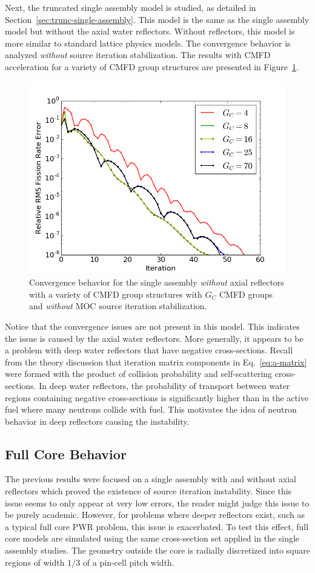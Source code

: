 Next, the truncated single assembly model is studied, as detailed in Section~\ref{sec:trunc-single-assembly}. This model is the same as the single assembly model but without the axial water reflectors. Without reflectors, this model is more similar to standard lattice physics models. The convergence behavior is analyzed \textit{without} source iteration stabilization. The results with \ac{CMFD} acceleration for a variety of \ac{CMFD} group structures are presented in Figure~\ref{fig:truncated-convergence}.
\begin{figure}[ht!]
	\centering
	\includegraphics[width=0.65\linewidth]{figures/convergence/sa_trunc_no_stab.png}
	\caption{Convergence behavior for the single assembly \textit{without} axial reflectors with a variety of \ac{CMFD} group structures with $G_C$ \ac{CMFD} groups and \textit{without} \ac{MOC} source iteration stabilization.}
	\label{fig:truncated-convergence}
\end{figure}
Notice that the convergence issues are not present in this model. This indicates the issue is caused by the axial water reflectors. More generally, it appears to be a problem with deep water reflectors that have negative cross-sections. Recall from the theory discussion that iteration matrix components in Eq.~\ref{eq:a-matrix} were formed with the product of collision probability and self-scattering cross-sections. In deep water reflectors, the probability of transport between water regions containing negative cross-sections is significantly higher than in the active fuel where many neutrons collide with fuel. This motivates the idea of neutron behavior in deep reflectors causing the instability. 

\subsection{Full Core Behavior}

The previous results were focused on a single assembly with and without axial reflectors which proved the existence of source iteration instability. Since this issue seems to only appear at very low errors, the reader might judge this issue to be purely academic. However, for problems where deeper reflectors exist, such as a typical full core \ac{PWR} problem, this issue is exacerbated. To test this effect, full core models are simulated using the same cross-section set applied in the single assembly studies. The geometry outside the core is radially discretized into square regions of width $1/3$ of a pin-cell pitch width.

